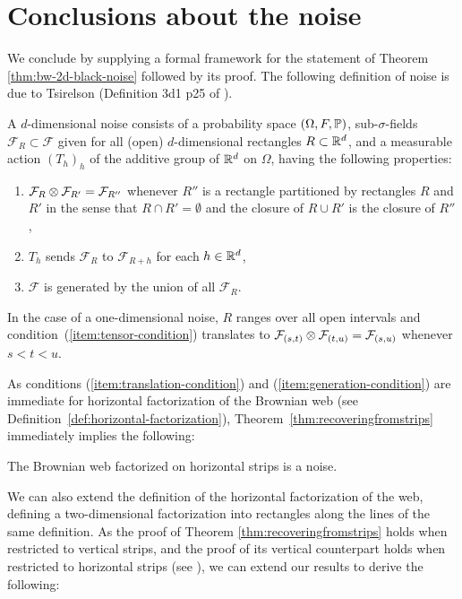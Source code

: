 {
\section{Conclusions about the noise}
\label{sec:conclusions-about-the-noise}

We conclude by supplying a formal framework for the statement of
Theorem \ref{thm:bw-2d-black-noise} followed by its proof.
The following definition of noise is due to Tsirelson (Definition
3d1 p25 of \cite{tsirelson-nonclassical-stochastic-flows}).

\newcommand{\F}{\mathcal{F}}
A $d$-dimensional noise consists of a probability space $(\Omega,F,
\P)$, sub-$\sigma$-fields $\F_R \subset \F$ given for all (open)
$d$-dimensional rectangles $R \subset \R^d$, and a measurable action
$(T_h)_h$ of the additive group of $\R^d$ on $\Omega$, having the following properties:

\begin{enumerate}
\item \label{item:tensor-condition} $\F_R \tensor \F_{R'} = \F_{R''}$ whenever $R''$ is a
rectangle partitioned by rectangles $R$ and $R'$ in the sense that
$R\cap R'=\emptyset$ and the closure of $R \cup R'$
is the closure of $R''$,
\item \label{item:translation-condition} $T_h$ sends $\F_R$ to $\F_{R+h}$ for each $h \in \R^d$,
\item \label{item:generation-condition} $\F$ is generated by the union of all $\F_R$.
\end{enumerate}

In the case of a one-dimensional noise, $R$ ranges over all open intervals
and condition~(\ref{item:tensor-condition}) translates to
$\F_{(s,t)} \tensor \F_{(t,u)} = \F_{(s,u)}$ whenever $s < t < u$.

As conditions (\ref{item:translation-condition}) and
(\ref{item:generation-condition}) are immediate for
horizontal factorization of the Brownian web (see
Definition~\ref{def:horizontal-factorization}),
Theorem~\ref{thm:recoveringfromstrips} immediately
implies the following:

\begin{proposition*}
The Brownian web factorized on horizontal strips is a noise.
\end{proposition*}

We can also extend the definition of the horizontal
factorization of the web, defining a two-dimensional
factorization into rectangles along the lines of the
same definition. As the proof of Theorem \ref{thm:recoveringfromstrips}
holds when restricted to vertical strips, and the proof of its vertical
counterpart holds when restricted to horizontal strips
(see \cite{tsirelson-scaling-limit-noise-stability}),
we can extend our results to derive the following:

}
